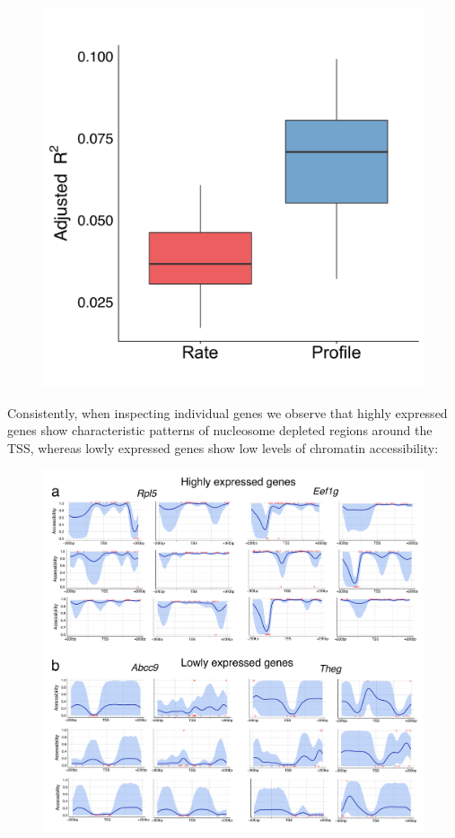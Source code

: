 \begin{figure}[H]
	\centering
	\includegraphics[width=0.65\linewidth]{scNMT_profiles_prediction}
	\caption[]{}
	\label{fig:scnmt_profiles_prediction}
\end{figure}


Consistently, when inspecting individual genes we observe that highly expressed genes show characteristic patterns of nucleosome depleted regions around the TSS, whereas lowly expressed genes show low levels of chromatin accessibility:

\begin{figure}[H]
	\centering
	\includegraphics[width=0.9\linewidth]{scNMT_profiles_expr}
	\caption[]{}
	\label{fig:scnmt_profiles_highexpr}
\end{figure}

